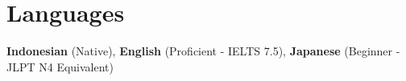 \section*{Languages}
\noindent\makebox[\linewidth]{\rule{\textwidth}{0.2pt}}

\textbf{Indonesian} (Native), \textbf{English} (Proficient - IELTS 7.5), \textbf{Japanese} (Beginner - JLPT N4 Equivalent) 